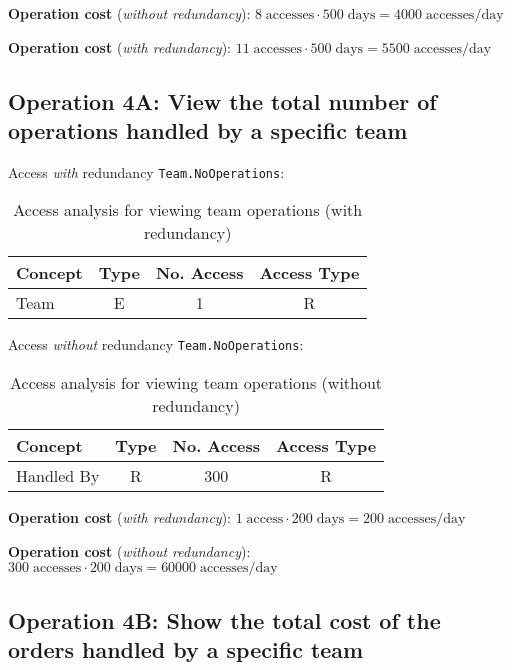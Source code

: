     \textbf{Operation cost} (\textit{without redundancy}): $8 \; \text{accesses} \cdot 500 \; \text{days} = 4000 \; \text{accesses/day}$ 

    \textbf{Operation cost} (\textit{with redundancy}): $11 \; \text{accesses} \cdot 500 \; \text{days} = 5500 \; \text{accesses/day}$
    
    \subsection*{Operation 4A: View the total number of operations handled by a specific team}
    
    Access \textit{with} redundancy \texttt{Team.NoOperations}:
    
    \begin{table}[h!]
    \centering
    \caption{Access analysis for viewing team operations (with redundancy)}
    \begin{tabular}{|l|c|c|c|}
    \hline
    \textbf{Concept} & \textbf{Type} & \textbf{No. Access} & \textbf{Access Type} \\
    \hline
    Team    & E & 1 & R \\
    \hline
    \end{tabular}
    \end{table}
    
    Access \textit{without} redundancy \texttt{Team.NoOperations}:
    
    \begin{table}[h!]
    \centering
    \caption{Access analysis for viewing team operations (without redundancy)}
    \begin{tabular}{|l|c|c|c|}
    \hline
    \textbf{Concept}    & \textbf{Type} & \textbf{No. Access} & \textbf{Access Type} \\
    \hline
    Handled By & R & 300 & R \\
    \hline
    \end{tabular}
    \end{table}
    
    \textbf{Operation cost} (\textit{with redundancy}): $1 \; \text{access} \cdot 200 \; \text{days} = 200 \; \text{accesses/day}$  

    \textbf{Operation cost} (\textit{without redundancy}): $300 \; \text{accesses} \cdot 200 \; \text{days} = 60000 \; \text{accesses/day}$
    \subsection*{Operation 4B: Show the total cost of the orders handled by a specific team}
    
